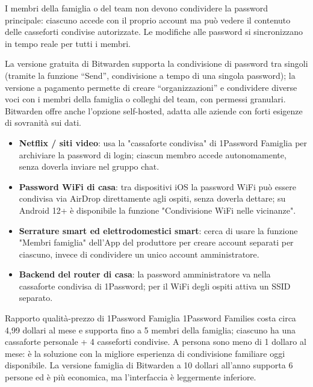 I membri della famiglia o del team non devono condividere la password principale: ciascuno accede con il proprio account ma può vedere il contenuto delle casseforti condivise autorizzate. Le modifiche alle password si sincronizzano in tempo reale per tutti i membri.


La versione gratuita di Bitwarden supporta la condivisione di password tra singoli (tramite la funzione “Send”, condivisione a tempo di una singola password); la versione a pagamento permette di creare “organizzazioni” e condividere diverse voci con i membri della famiglia o colleghi del team, con permessi granulari. Bitwarden offre anche l'opzione self-hosted, adatta alle aziende con forti esigenze di sovranità sui dati.


\begin{itemize}
  \item \textbf{Netflix / siti video}: usa la "cassaforte condivisa" di 1Password Famiglia per archiviare la password di login; ciascun membro accede autonomamente, senza doverla inviare nel gruppo chat.
  \item \textbf{Password WiFi di casa}: tra dispositivi iOS la password WiFi può essere condivisa via AirDrop direttamente agli ospiti, senza doverla dettare; su Android 12+ è disponibile la funzione "Condivisione WiFi nelle vicinanze".
  \item \textbf{Serrature smart ed elettrodomestici smart}: cerca di usare la funzione "Membri famiglia" dell'App del produttore per creare account separati per ciascuno, invece di condividere un unico account amministratore.
  \item \textbf{Backend del router di casa}: la password amministratore va nella cassaforte condivisa di 1Password; per il WiFi degli ospiti attiva un SSID separato.
\end{itemize}

\begin{tcbinfo}{Rapporto qualità-prezzo di 1Password Famiglia}
1Password Families costa circa 4,99 dollari al mese e supporta fino a 5 membri della famiglia; ciascuno ha una cassaforte personale + 4 casseforti condivise. A persona sono meno di 1 dollaro al mese: è la soluzione con la migliore esperienza di condivisione familiare oggi disponibile. La versione famiglia di Bitwarden a 10 dollari all'anno supporta 6 persone ed è più economica, ma l'interfaccia è leggermente inferiore.

\end{tcbinfo}

